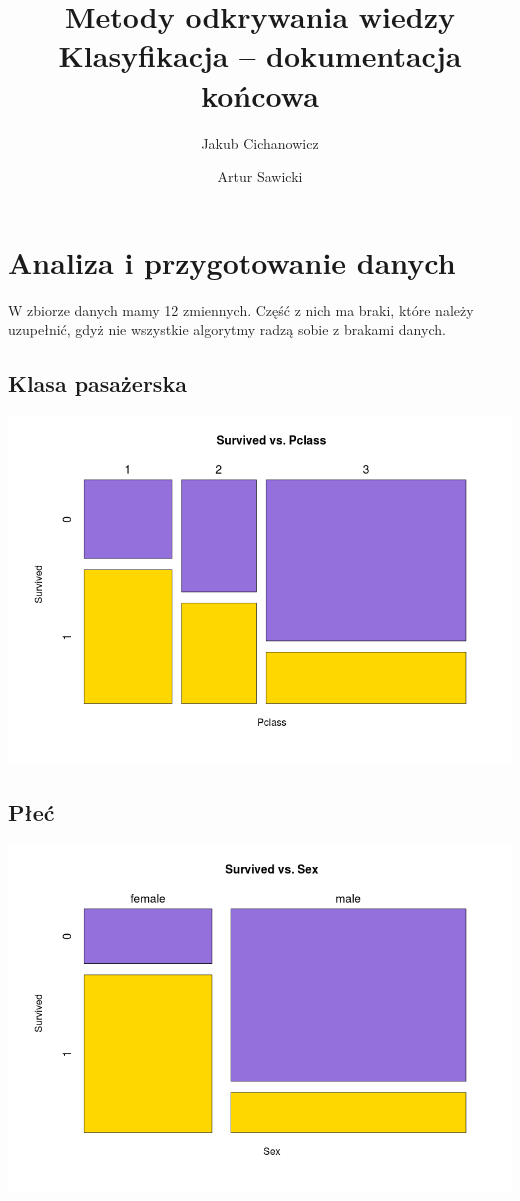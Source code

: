 \documentclass{article}
\begin{document}
\title{Metody odkrywania wiedzy \\%
{\large Klasyfikacja -- dokumentacja końcowa} }

\author{Jakub Cichanowicz \and Artur Sawicki}

\maketitle

\section{Analiza i przygotowanie danych}
W zbiorze danych mamy 12 zmiennych. Część z nich ma braki, które należy uzupełnić, gdyż nie wszystkie algorytmy radzą sobie z brakami danych.

\subsection{Klasa pasażerska}

\includegraphics[scale=0.40]{images/survived-vs-pclass.png}

\subsection{Płeć}

\includegraphics[scale=0.40]{images/survived-vs-sex.png}
\end{document}
